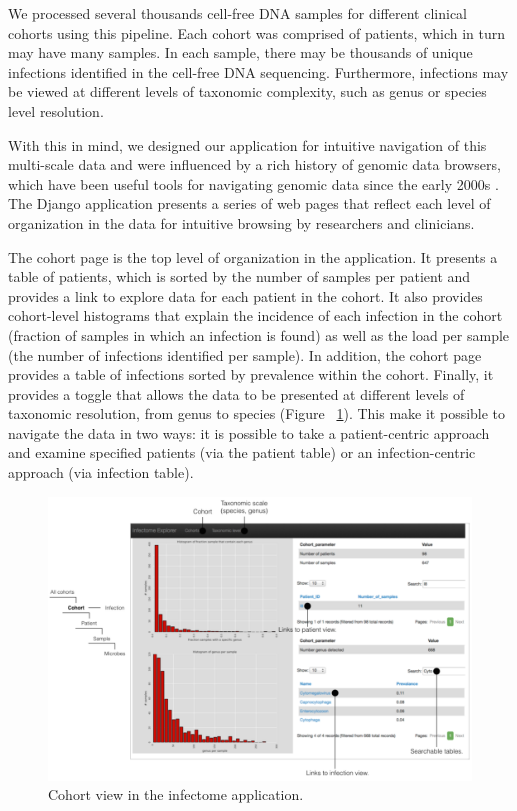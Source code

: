 We processed several thousands cell-free DNA samples for different clinical cohorts using this pipeline. Each cohort was comprised of patients, which in turn may have many samples. In each sample, there may be thousands of unique infections identified in the cell-free DNA sequencing. Furthermore, infections may be viewed at different levels of taxonomic complexity, such as genus or species level resolution. 

With this in mind, we designed our application for intuitive navigation of this multi-scale data and were influenced by a rich history of genomic data browsers, which have been useful tools for navigating genomic data since the early 2000s \cite{ODonoghue:2010bd}. The Django application presents a series of web pages that reflect each level of organization in the data for intuitive browsing by researchers and clinicians.

The cohort page is the top level of organization in the application. It presents a table of patients, which is sorted by the number of samples per patient and provides a link to explore data for each patient in the cohort. It also provides cohort-level histograms that explain the incidence of each infection in the cohort (fraction of samples in which an infection is found) as well as the load per sample (the number of infections identified per sample). In addition, the cohort page provides a table of infections sorted by prevalence within the cohort. Finally, it provides a toggle that allows the data to be presented at different levels of taxonomic resolution, from genus to species (Figure ~\ref{fig:Fig5}). This make it possible to navigate the data in two ways: it is possible to take a patient-centric approach and examine specified patients (via the patient table) or an infection-centric approach (via infection table).

\begin{figure}
\center\includegraphics[width=150mm,scale=0.5]{Figures/Fig5}
\caption{Cohort view in the infectome application.}
\label{fig:Fig5}
\end{figure}


